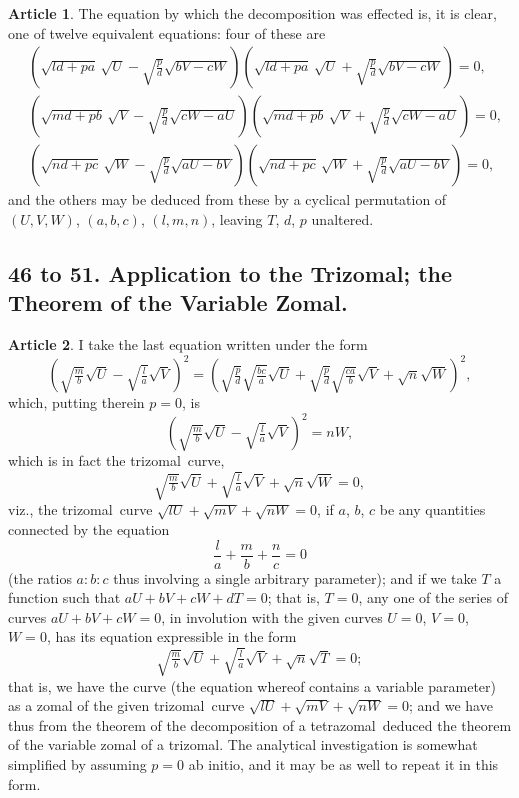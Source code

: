 \documentclass[11pt,a4paper]{article}
\theoremstyle{definition}
\newtheorem{art}{Article}
\newcommand{\trizomal}{trizomal}
\newcommand{\tetrazomal}{tetrazomal}
\begin{document}
\begin{art}
The equation by which the decomposition was effected is, it is clear, one of twelve equivalent equations: four of these are
\begin{align*}
&\left(\sqrt{ld + pa}\,\sqrt{U} - \sqrt{\tfrac{p}{d}}\sqrt{bV - cW}\right) \left(\sqrt{ld + pa}\,\sqrt{U} + \sqrt{\tfrac{p}{d}}\sqrt{bV - cW}\right) = 0, \\
&\left(\sqrt{md + pb}\,\sqrt{V} - \sqrt{\tfrac{p}{d}}\sqrt{cW - aU}\right) \left(\sqrt{md + pb}\,\sqrt{V} + \sqrt{\tfrac{p}{d}}\sqrt{cW - aU}\right) = 0, \\
&\left(\sqrt{nd + pc}\,\sqrt{W} - \sqrt{\tfrac{p}{d}}\sqrt{aU - bV}\right) \left(\sqrt{nd + pc}\,\sqrt{W} + \sqrt{\tfrac{p}{d}}\sqrt{aU - bV}\right) = 0,
\end{align*}
and the others may be deduced from these by a cyclical permutation of $(U, V, W)$, $(a, b, c)$, $(l, m, n)$, leaving $T$, $d$, $p$ unaltered.
\end{art}



\subsection*{46 to 51. Application to the Trizomal; the Theorem of the Variable Zomal.}

\begin{art}
I take the last equation written under the form
\[
\left(\sqrt{\tfrac{m}{b}}\sqrt{U} - \sqrt{\tfrac{l}{a}}\sqrt{V}\right)^{2} = \left(\sqrt{\tfrac{p}{d}}\sqrt{\tfrac{bc}{a}}\sqrt{U} + \sqrt{\tfrac{p}{d}}\sqrt{\tfrac{ca}{b}}\sqrt{V} + \sqrt{n}\sqrt{W}\right)^{2},
\]
which, putting therein $p = 0$, is
\[
\left(\sqrt{\tfrac{m}{b}}\sqrt{U} - \sqrt{\tfrac{l}{a}}\sqrt{V}\right)^{2} = nW,
\]
which is in fact the \trizomal\ curve,
\[
\sqrt{\tfrac{m}{b}}\sqrt{U} + \sqrt{\tfrac{l}{a}}\sqrt{V} + \sqrt{n}\sqrt{W} = 0,
\]
viz., the \trizomal\ curve $\sqrt{lU} + \sqrt{mV} + \sqrt{nW} = 0$, if $a$, $b$, $c$ be any quantities connected by the equation
\[
\frac{l}{a} + \frac{m}{b} + \frac{n}{c} = 0
\]
(the ratios $a : b : c$ thus involving a single arbitrary parameter); and if we take $T$ a function such that $aU + bV + cW + dT = 0$; that is, $T = 0$, any one of the series of curves $aU + bV + cW = 0$, in involution with the given curves $U = 0$, $V = 0$, $W = 0$, has its equation expressible in the form
\[
\sqrt{\tfrac{m}{b}}\sqrt{U} + \sqrt{\tfrac{l}{a}}\sqrt{V} + \sqrt{n}\sqrt{T} = 0;
\]
that is, we have the curve (the equation whereof contains a variable parameter) as a zomal of the given \trizomal\ curve $\sqrt{lU} + \sqrt{mV} + \sqrt{nW} = 0$; and we have thus from the theorem of the decomposition of a \tetrazomal\ deduced the theorem of the variable zomal of a \trizomal. The analytical investigation is somewhat simplified by assuming $p = 0$ ab initio, and it may be as well to repeat it in this form.
\end{art}
\end{document}
